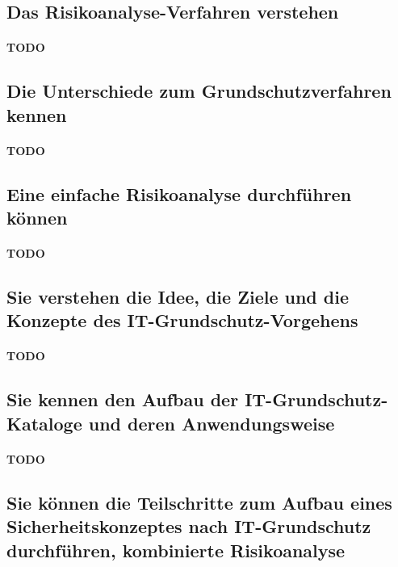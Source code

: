 \documentclass[10pt,a4paper]{article}
\begin{document}
\subsection*{Das Risikoanalyse-Verfahren verstehen}
\paragraph*{TODO}

\subsection*{Die Unterschiede zum Grundschutzverfahren kennen}
\paragraph*{TODO}

\subsection*{Eine einfache Risikoanalyse durchführen können}
\paragraph*{TODO}

\subsection*{Sie verstehen die Idee, die Ziele und die Konzepte des IT-Grundschutz-Vorgehens}
\paragraph*{TODO}

\subsection*{Sie kennen den Aufbau der IT-Grundschutz-Kataloge und deren Anwendungsweise}
\paragraph*{TODO}

\subsection*{Sie können die Teilschritte zum Aufbau eines Sicherheitskonzeptes nach IT-Grundschutz durchführen, kombinierte Risikoanalyse}
\end{document}
